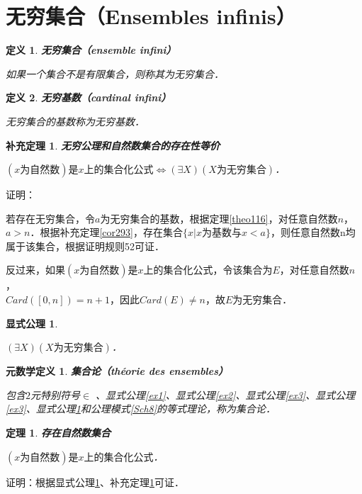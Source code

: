 \documentclass[12pt, a4paper, oneside]{book}
\newtheorem{metadef}{元数学定义}
\newtheorem{ex}{显式公理}
\newtheorem{theo}{定理}
\newtheorem{cor}{补充定理}
\newtheorem{de}{定义}
\begin{document}
		\section{无穷集合（Ensembles infinis）}		
			\begin{de}
				\textbf{无穷集合（ensemble infini）}
				\par
				如果一个集合不是有限集合，则称其为无穷集合．
			\end{de}
			
			\begin{de}
				\textbf{无穷基数（cardinal infini）}
				\par
				无穷集合的基数称为无穷基数．
			\end{de}
			
			\begin{cor}\label{cor332}
				\textbf{无穷公理和自然数集合的存在性等价}
				\par
				$(x\text{为自然数})\text{是}x\text{上的集合化公式}\Leftrightarrow (\exists X)(X\text{为无穷集合})$．
			\end{cor}
			证明：
			\par
			若存在无穷集合，令$a$为无穷集合的基数，根据定理\ref{theo116}，对任意自然数$n$，$a>n$．根据补充定理\ref{cor293}，存在集合$\{x|x\text{为基数}\text{与}x<a\}$，则任意自然数n均属于该集合，根据证明规则52可证．
			\par
			反过来，如果$(x\text{为自然数})\text{是}x\text{上的集合化公式}$，令该集合为$E$，对任意自然数$n$，\\$Card([0, n])=n+1$，因此$Card(E)\neq n$，故$E$为无穷集合．
			
			\begin{ex}\label{ex4}
				\par
				$(\exists X)(X\text{为无穷集合})$．
			\end{ex}
			
			\begin{metadef}
				\textbf{集合论（théorie des ensembles）}
				\par
				包含$2$元特别符号$\in$ 、显式公理\ref{ex1}、显式公理\ref{ex2}、显式公理\ref{ex3}、显式公理\ref{ex3}、显式公理\ref{ex4}和公理模式\ref{Sch8}的等式理论，称为集合论．
			\end{metadef}
			
			\begin{theo}\label{theo153}
				\textbf{存在自然数集合}
				\par
				$(x\text{为自然数})\text{是}x\text{上的集合化公式}$．
			\end{theo}
			证明：根据显式公理\ref{ex4}、补充定理\ref{cor332}可证．
						
\end{document}

